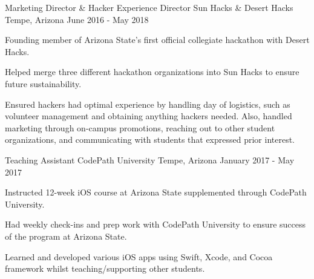 \documentclass[
    changecolor={96, 52, 177},
]{peter-resume}
\begin{document}
\cventry
  {Marketing Director \& Hacker Experience Director}
  {Sun Hacks \& Desert Hacks}
  {Tempe, Arizona}
  {June 2016 - May 2018}
  {
    \begin{cvitems}
      \item {Founding member of Arizona State's first official collegiate hackathon with Desert Hacks.}
      \item {Helped merge three different hackathon organizations into Sun Hacks to ensure future sustainability.}
      \item {Ensured hackers had optimal experience by handling day of logistics, such as volunteer management and obtaining anything hackers needed. Also, handled marketing through on-campus promotions, reaching out to other student organizations, and communicating with students that expressed prior interest.}
    \end{cvitems}
  }
\cventry
  {Teaching Assistant}
  {CodePath University}
  {Tempe, Arizona}
  {January 2017 - May 2017}
  {
    \begin{cvitems}
      \item {Instructed 12-week iOS course at Arizona State supplemented through CodePath University.}
      \item {Had weekly check-ins and prep work with CodePath University to ensure success of the program at Arizona State.}
      \item {Learned and developed various iOS apps using Swift, Xcode, and Cocoa framework whilst teaching/supporting other students.}
    \end{cvitems}
  }

  \begin{cvskills}
  \end{cvskills}
\end{document}
